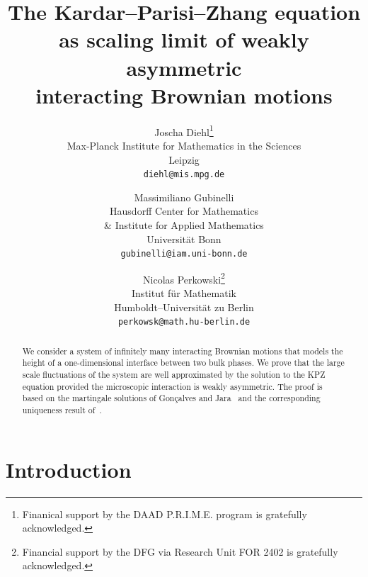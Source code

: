 \documentclass[11pt, a4paper]{article}
\newcommand{\1}{\mathbf{1}}
\begin{document}
\title{The Kardar--Parisi--Zhang equation\\ as scaling limit of weakly asymmetric\\ interacting Brownian motions}
\author{
  Joscha Diehl\thanks{Finanical support by the DAAD P.R.I.M.E. program is gratefully acknowledged.}\\
  Max-Planck Institute for Mathematics in the Sciences \\
  Leipzig \\
  \texttt{diehl@mis.mpg.de}
  \and
  Massimiliano Gubinelli\\
  Hausdorff Center for Mathematics\\
   \& Institute for Applied Mathematics\\
   Universit{\"a}t Bonn \\
  \texttt{gubinelli@iam.uni-bonn.de}
  \and
  Nicolas Perkowski\thanks{Financial support by the DFG via Research Unit FOR 2402 is gratefully acknowledged.} \\
  Institut f\"ur Mathematik \\
  Humboldt--Universit\"at zu Berlin \\
  \texttt{perkowsk@math.hu-berlin.de}
}


\maketitle

\begin{abstract}
   We consider a system of infinitely many interacting Brownian motions that models the height of a one-dimensional interface between two bulk phases. We prove that the large scale fluctuations of the system  are well approximated by the solution to the KPZ equation provided the microscopic interaction is weakly asymmetric. The proof is based on the martingale solutions of Gon\c calves and Jara~\cite{bib:goncalvesJara} and the corresponding uniqueness result of~\cite{bib:energyUniqueness}.
\end{abstract}



\section{Introduction}
\end{document}
